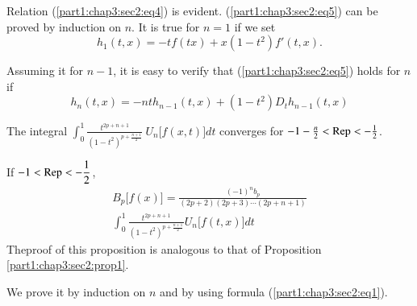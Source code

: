 Relation (\ref{part1:chap3:sec2:eq4}) is
evident. (\ref{part1:chap3:sec2:eq5}) can be proved by induction on $n$. It
is true for $n=1$ if we set  
$$
h_1 (t, x) = -t f (tx) + x (1-t^2) f' (t, x).
$$

Assuming it for $n-1$, it is easy to verify that
(\ref{part1:chap3:sec2:eq5}) holds for $n$ if 
$$
h_n (t, x) = -nth_{n-1} (t, x) + (1-t^2) D_t h_{n-1} (t, x) 
$$
\begin{coro*}
  The integral $\int^1_0 \frac{t^{2p+n+1}}{(1-t^2)^{p+
      \frac{n+1}{2}}} ~ U_n \big[ f (x, t) \big] dt$ converges for
  $-1-\frac{n}{2} < \operatorname{Rep} < - \frac{1}{2}$.  
\end{coro*}

\begin{proposition}\label{part1:chap3:sec2:prop3}%
  If $ -1 < \operatorname{Rep} < - \dfrac{1}{2}$,
  \begin{multline*}
    B_p \big[ f (x) \big] = \frac{(-1)^n b_p}{(2p+2) (2p+3) \cdots
      (2p+n+1)}\\ 
    \int^1_0 \frac{t^{2p+n+1}}{(1-t^2)^{p+\frac{n+1}{2}}}
    U_n \big[ f (t, x) \big] dt 
  \end{multline*}
  The\pageoriginale proof of this proposition is analogous to that of
  Proposition \ref{part1:chap3:sec2:prop1}. 
\end{proposition}

We prove it by induction on $n$ and by using formula
(\ref{part1:chap3:sec2:eq1}).

